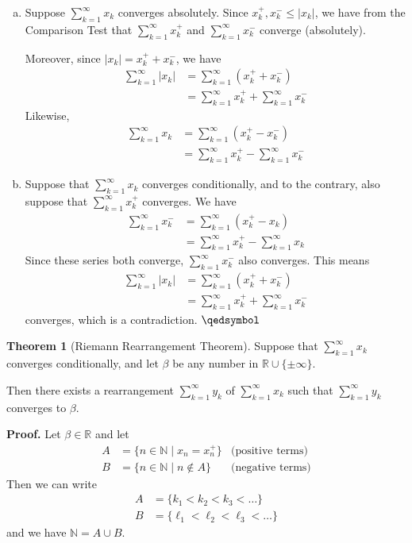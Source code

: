 \documentclass[11pt]{article}
\theoremstyle{definition}
\newtheorem{thm}{Theorem}[section]
\newcommand{\mbN}{\ensuremath{\mathbb{N}}}
\newcommand{\mbR}{\ensuremath{\mathbb{R}}}
\begin{document}
\begin{enumerate}[(a)] \vspace{-0.2cm}

\item Suppose $\sum_{k=1}^\infty x_k$ converges absolutely. Since $x_k^+, x_k^- \leq |x_k|$, we have from the Comparison Test that $\sum_{k=1}^\infty x_k^+$ and $\sum_{k=1}^\infty x_k^-$ converge (absolutely). 

Moreover, since $|x_k| = x_k^+ + x_k^-$, we have
\begin{align*}
\sum_{k=1}^\infty |x_k| & = \sum_{k=1}^\infty (x_k^+ + x_k^-) \\
& = \sum_{k=1}^\infty x_k^+ + \sum_{k=1}^\infty x_k^-
\end{align*}
Likewise,
\begin{align*}
\sum_{k=1}^\infty x_k & = \sum_{k=1}^\infty (x_k^+ - x_k^-) \\
& = \sum_{k=1}^\infty x_k^+ - \sum_{k=1}^\infty x_k^-
\end{align*}

\item Suppose that $\sum_{k=1}^\infty x_k$ converges conditionally, and to the contrary, also suppose that $\sum_{k=1}^\infty x_k^+$ converges. We have
\begin{align*}
\sum_{k=1}^\infty x_k^- & = \sum_{k=1}^\infty (x_k^+ - x_k) \\
& = \sum_{k=1}^\infty x_k^+ - \sum_{k=1}^\infty x_k
\end{align*}
Since these series both converge, $\sum_{k=1}^\infty x_k^-$ also converges. This means
\begin{align*}
\sum_{k=1}^\infty |x_k| & = \sum_{k=1}^\infty (x_k^+ + x_k^-) \\
& = \sum_{k=1}^\infty x_k^+ + \sum_{k=1}^\infty x_k^-
\end{align*}
converges, which is a contradiction. $\qedsymbol$

\end{enumerate}

\begin{thm}[Riemann Rearrangement Theorem]
Suppose that $\sum_{k=1}^\infty x_k$ converges conditionally, and let $\beta$ be any number in $\mbR \cup \{\pm\infty\}$. 

Then there exists a rearrangement $\sum_{k=1}^\infty y_k$ of $\sum_{k=1}^\infty x_k$ such that $\sum_{k=1}^\infty y_k$ converges to $\beta$.
\end{thm}
\textbf{Proof.}
Let $\beta \in \mbR$ and let
\begin{align*}
A & = \{n \in \mbN \mid x_n = x_n^+\} & \text{(positive terms)} \\
B & = \{n \in \mbN \mid n \notin A\} & \text{(negative terms)}
\end{align*}
Then we can write
\begin{align*}
A & = \{k_1 < k_2 < k_3 < \dots\} \\
B & = \{\ell_1 < \ell_2 < \ell_3 < \dots\}
\end{align*}
and we have $\mbN = A \cup B$.
\end{document}
